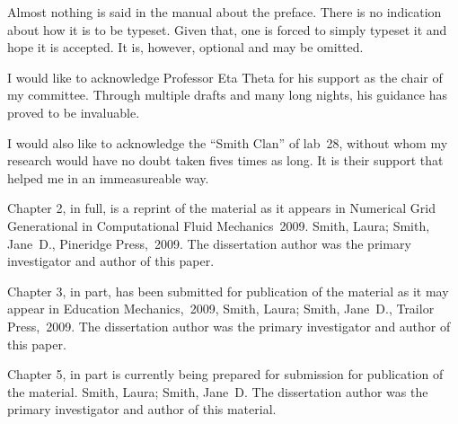\documentclass[12pt]{ucsddissertation}
\begin{document}
\tableofcontents
\listoffigures
\listoftables

\begin{preface}
Almost nothing is said in the manual about the preface. There is no
indication about how it is to be typeset. Given that, one is forced to
simply typeset it and hope it is accepted. It is, however, optional
and may be omitted.
\end{preface}

\begin{acknowledgements}
I would like to acknowledge Professor Eta Theta for his support as the
chair of my committee. Through multiple drafts and many long nights,
his guidance has proved to be invaluable.

I would also like to acknowledge the ``Smith Clan'' of lab~28, without
whom my research would have no doubt taken fives times as long. It is
their support that helped me in an immeasureable way.

Chapter 2, in full, is a reprint of the material as it appears in
Numerical Grid Generational in Computational Fluid Mechanics~2009.
Smith, Laura; Smith, Jane~D., Pineridge Press,~2009. The dissertation
author was the primary investigator and author of this paper.

Chapter 3, in part, has been submitted for publication of the material
as it may appear in Education Mechanics,~2009, Smith, Laura; Smith,
Jane~D., Trailor Press,~2009. The dissertation author was the primary
investigator and author of this paper.

Chapter 5, in part is currently being prepared for submission for
publication of the material. Smith, Laura; Smith, Jane~D\@. The
dissertation author was the primary investigator and author of this
material.
\end{acknowledgements}
\end{document}
